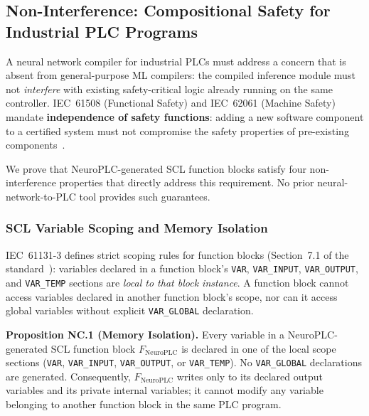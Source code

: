 \subsection{Non-Interference: Compositional Safety for Industrial PLC Programs}
\label{sec:noninterference}

A neural network compiler for industrial PLCs must address a concern that
is absent from general-purpose ML compilers: the compiled inference module
must not \textit{interfere} with existing safety-critical logic already
running on the same controller. IEC~61508 (Functional Safety) and
IEC~62061 (Machine Safety) mandate \textbf{independence of safety functions}:
adding a new software component to a certified system must not compromise
the safety properties of pre-existing components~\cite{iec61508_2010}.

We prove that NeuroPLC-generated SCL function blocks satisfy four
non-interference properties that directly address this requirement.
No prior neural-network-to-PLC tool provides such guarantees.

\subsubsection{SCL Variable Scoping and Memory Isolation}

IEC~61131-3 defines strict scoping rules for function blocks
(Section~7.1 of the standard~\cite{iec61131-3_2025}):
variables declared in a function block's \texttt{VAR}, \texttt{VAR\_INPUT},
\texttt{VAR\_OUTPUT}, and \texttt{VAR\_TEMP} sections are
\textit{local to that block instance}. A function block cannot access
variables declared in another function block's scope, nor can it access
global variables without explicit \texttt{VAR\_GLOBAL} declaration.

\vspace{4pt}
\noindent\textbf{Proposition NC.1 (Memory Isolation).}
\label{prop:memory_isolation} Every variable in a NeuroPLC-generated SCL function block
$F_{\text{NeuroPLC}}$ is declared in one of the local scope sections
(\texttt{VAR}, \texttt{VAR\_INPUT}, \texttt{VAR\_OUTPUT}, or
\texttt{VAR\_TEMP}). No \texttt{VAR\_GLOBAL} declarations are generated.
Consequently, $F_{\text{NeuroPLC}}$ writes only to its declared output
variables and its private internal variables; it cannot modify any
variable belonging to another function block in the same PLC program.

